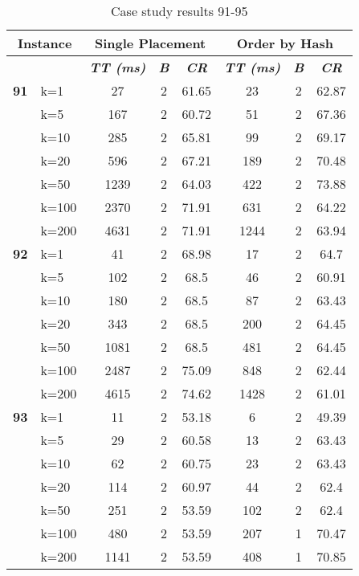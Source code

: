     \begin{table}[htbp]
    \caption{Case study results 91-95}
    \centering
    \begin{tabular}{|l|l|c|c|c|c|c|c|}
    \hline
    \multicolumn{ 2}{|c|}{\textbf{Instance}} & \multicolumn{ 3}{c|}{\textbf{Single Placement}} & \multicolumn{ 3}{c|}{\textbf{Order by Hash}} \\ \hline
    \multicolumn{ 2}{|l|}{} & \textbf{\textit{TT (ms)}} & \textbf{\textit{B}} & \textbf{\textit{CR}} & \textbf{\textit{TT (ms)}} & \textbf{\textit{B}} & \textbf{\textit{CR}} \\ \hline
    \multicolumn{1}{|r|}{\textbf{91}} & k=1 & 27 & 2 & 61.65 & 23 & 2 & 62.87 \\ 
     & k=5 & 167 & 2 & 60.72 & 51 & 2 & 67.36 \\ 
     & k=10 & 285 & 2 & 65.81 & 99 & 2 & 69.17 \\ 
     & k=20 & 596 & 2 & 67.21 & 189 & 2 & 70.48 \\ 
     & k=50 & 1239 & 2 & 64.03 & 422 & 2 & 73.88 \\ 
     & k=100 & 2370 & 2 & 71.91 & 631 & 2 & 64.22 \\ 
     & k=200 & 4631 & 2 & 71.91 & 1244 & 2 & 63.94 \\ \hline
    \multicolumn{1}{|r|}{\textbf{92}} & k=1 & 41 & 2 & 68.98 & 17 & 2 & 64.7 \\ 
     & k=5 & 102 & 2 & 68.5 & 46 & 2 & 60.91 \\ 
     & k=10 & 180 & 2 & 68.5 & 87 & 2 & 63.43 \\ 
     & k=20 & 343 & 2 & 68.5 & 200 & 2 & 64.45 \\ 
     & k=50 & 1081 & 2 & 68.5 & 481 & 2 & 64.45 \\ 
     & k=100 & 2487 & 2 & 75.09 & 848 & 2 & 62.44 \\ 
     & k=200 & 4615 & 2 & 74.62 & 1428 & 2 & 61.01 \\ \hline
    \multicolumn{1}{|r|}{\textbf{93}} & k=1 & 11 & 2 & 53.18 & 6 & 2 & 49.39 \\ 
     & k=5 & 29 & 2 & 60.58 & 13 & 2 & 63.43 \\ 
     & k=10 & 62 & 2 & 60.75 & 23 & 2 & 63.43 \\ 
     & k=20 & 114 & 2 & 60.97 & 44 & 2 & 62.4 \\ 
     & k=50 & 251 & 2 & 53.59 & 102 & 2 & 62.4 \\ 
     & k=100 & 480 & 2 & 53.59 & 207 & 1 & 70.47 \\ 
     & k=200 & 1141 & 2 & 53.59 & 408 & 1 & 70.85 \\ \hline

\end{tabular}
\end{table}
